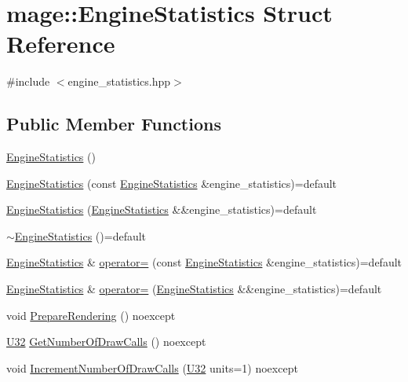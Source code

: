 \hypertarget{structmage_1_1_engine_statistics}{}\section{mage\+:\+:Engine\+Statistics Struct Reference}
\label{structmage_1_1_engine_statistics}


{\ttfamily \#include $<$engine\+\_\+statistics.\+hpp$>$}

\subsection*{Public Member Functions}
\begin{DoxyCompactItemize}
\item 
\hyperlink{structmage_1_1_engine_statistics_acbaa39e0e0ee0d6cb5c8d174bb80a3fd}{Engine\+Statistics} ()
\item 
\hyperlink{structmage_1_1_engine_statistics_a8361fa991298c7669b4e3c8262acff60}{Engine\+Statistics} (const \hyperlink{structmage_1_1_engine_statistics}{Engine\+Statistics} \&engine\+\_\+statistics)=default
\item 
\hyperlink{structmage_1_1_engine_statistics_acb3eb7a8f16733d29b4a0e4490723cd5}{Engine\+Statistics} (\hyperlink{structmage_1_1_engine_statistics}{Engine\+Statistics} \&\&engine\+\_\+statistics)=default
\item 
\hyperlink{structmage_1_1_engine_statistics_a471f643061b881ae69cc807b34c48127}{$\sim$\+Engine\+Statistics} ()=default
\item 
\hyperlink{structmage_1_1_engine_statistics}{Engine\+Statistics} \& \hyperlink{structmage_1_1_engine_statistics_a6c5e8b9a5806e67f6f93a3c558293249}{operator=} (const \hyperlink{structmage_1_1_engine_statistics}{Engine\+Statistics} \&engine\+\_\+statistics)=default
\item 
\hyperlink{structmage_1_1_engine_statistics}{Engine\+Statistics} \& \hyperlink{structmage_1_1_engine_statistics_a4674d3856fee372e05f1bed017e46d5b}{operator=} (\hyperlink{structmage_1_1_engine_statistics}{Engine\+Statistics} \&\&engine\+\_\+statistics)=default
\item 
void \hyperlink{structmage_1_1_engine_statistics_a722912aa5e93caff589a52bb10be930d}{Prepare\+Rendering} () noexcept
\item 
\hyperlink{namespacemage_a41c104c036fba3756a74e19f793eeaa1}{U32} \hyperlink{structmage_1_1_engine_statistics_a2bfcab5d823c018174e205741cbed4d4}{Get\+Number\+Of\+Draw\+Calls} () noexcept
\item 
void \hyperlink{structmage_1_1_engine_statistics_af26859407a4780e9471131fcfbe3a125}{Increment\+Number\+Of\+Draw\+Calls} (\hyperlink{namespacemage_a41c104c036fba3756a74e19f793eeaa1}{U32} units=1) noexcept
\end{DoxyCompactItemize}

